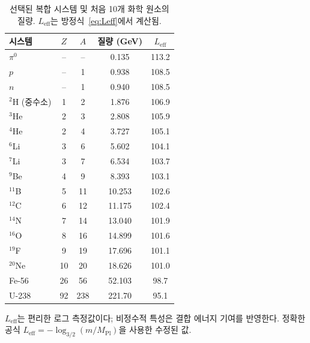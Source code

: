 \documentclass[11pt,a4paper]{article}
\begin{document}
	\begin{table}[H]
		\centering
		\caption{선택된 복합 시스템 및 처음 10개 화학 원소의 질량. \(L_{\mathrm{eff}}\)는 방정식~\eqref{eq:Leff}에서 계산됨.}
		\label{tab:composite}
		\small
		\begin{tabular}{l c c c c}
			\toprule
			시스템 & \(Z\) & \(A\) & 질량 (GeV) & \(L_{\mathrm{eff}}\) \\
			\midrule
			\(\pi^0\) & – & – & 0.135 & 113.2 \\
			\(p\) & – & 1 & 0.938 & 108.5 \\
			\(n\) & – & 1 & 0.940 & 108.5 \\
			\(^2\)H (중수소) & 1 & 2 & 1.876 & 106.9 \\
			\(^3\)He & 2 & 3 & 2.808 & 105.9 \\
			\(^4\)He & 2 & 4 & 3.727 & 105.1 \\
			\(^6\)Li & 3 & 6 & 5.602 & 104.1 \\
			\(^7\)Li & 3 & 7 & 6.534 & 103.7 \\
			\(^9\)Be & 4 & 9 & 8.393 & 103.1 \\
			\(^{11}\)B & 5 & 11 & 10.253 & 102.6 \\
			\(^{12}\)C & 6 & 12 & 11.175 & 102.4 \\
			\(^{14}\)N & 7 & 14 & 13.040 & 101.9 \\
			\(^{16}\)O & 8 & 16 & 14.899 & 101.6 \\
			\(^{19}\)F & 9 & 19 & 17.696 & 101.1 \\
			\(^{20}\)Ne & 10 & 20 & 18.626 & 101.0 \\
			Fe-56 & 26 & 56 & 52.103 & 98.7 \\
			U-238 & 92 & 238 & 221.70 & 95.1 \\
			\bottomrule
		\end{tabular}
		\par\smallskip
		\footnotesize \(L_{\mathrm{eff}}\)는 편리한 로그 측정값이다; 비정수적 특성은 결합 에너지 기여를 반영한다. 정확한 공식 \(L_{\mathrm{eff}} = -\log_{3/2}(m/M_{\mathrm{Pl}})\)을 사용한 수정된 값.
	\end{table}
	
\end{document}
